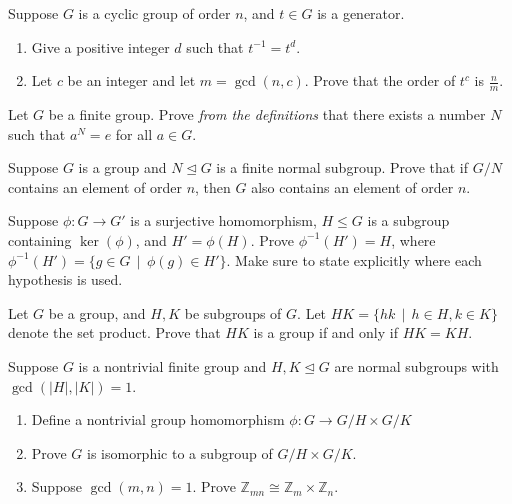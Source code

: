 \documentclass[11pt,twoside,openany]{memoir}
\begin{document}
        \begin{exercise}
            Suppose $G$ is a cyclic group of order $n$, and $t\in G$ is a generator.
            \begin{enumerate}[label=(\alph*)]
                \item Give a positive integer $d$ such that $t^{-1}=t^d$.
                \item Let $c$ be an integer and let $m=\gcd(n,c)$. Prove that the order of $t^c$ is $\frac{n}{m}$.
            \end{enumerate}
            \end{exercise}
            
            \begin{exercise}
            Let $G$ be a finite group. Prove \textit{from the definitions} that there exists a number $N$ such that $a^N=e$ for all $a\in G$.
            \end{exercise}
            
            \begin{exercise}
            Suppose $G$ is a group and $N\unlhd G$ is a finite normal subgroup. Prove that if $G/N$ contains an element of order $n$, then $G$ also contains an element of order $n$.
            \end{exercise}
            
            \begin{exercise}
            Suppose $\phi:G\to G'$ is a surjective homomorphism, $H\le G$ is a subgroup containing $\ker(\phi)$, and $H'=\phi(H)$. Prove $\phi^{-1}(H')=H$, where $\phi^{-1}(H')=\{g\in G\,\mid\, \phi(g)\in H'\}$. Make sure to state explicitly where each hypothesis is used.
            \end{exercise}
            
            \begin{exercise}
            Let $G$ be a group, and $H, K$ be subgroups of $G$. Let $HK=\{hk\,\mid \, h\in H, k\in K\}$ denote the set product. Prove that $HK$ is a group if and only if $HK=KH$.
            \end{exercise}
            
            \begin{exercise}
            Suppose $G$ is a nontrivial finite group and $H,K\mathrel{\unlhd}G$ are normal subgroups with $\gcd(|H|,|K|)=1$.
            \begin{enumerate}[label=(\alph*)]
                \item Define a nontrivial group homomorphism $\phi:G\to G/H\times G/K$
                \item Prove $G$ is isomorphic to a subgroup of $G/H\times G/K$.
                \item Suppose $\gcd(m,n)=1$. Prove $\mathbb{Z}_{mn}\cong \mathbb{Z}_m\times \mathbb{Z}_n$.
            \end{enumerate}
            \end{exercise}
            
\end{document}
